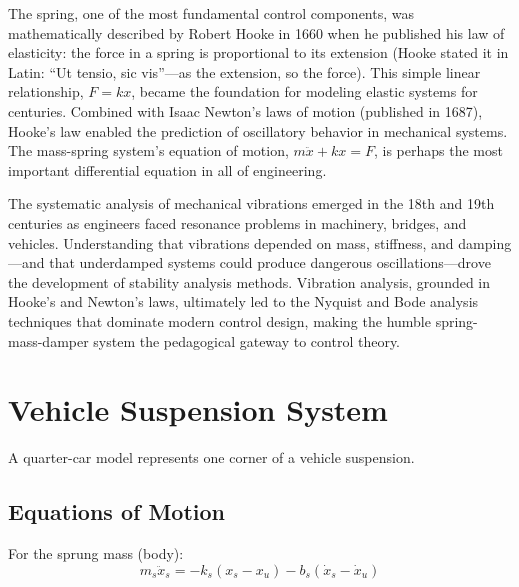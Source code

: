 \begin{historicalbox}[title={Historical Context: Hooke's Law, Newton's Mechanics, and Vibration Analysis}]
The spring, one of the most fundamental control components, was mathematically described by Robert Hooke in 1660 when he published his law of elasticity: the force in a spring is proportional to its extension (Hooke stated it in Latin: ``Ut tensio, sic vis''---as the extension, so the force). This simple linear relationship, $F = kx$, became the foundation for modeling elastic systems for centuries. Combined with Isaac Newton's laws of motion (published in 1687), Hooke's law enabled the prediction of oscillatory behavior in mechanical systems. The mass-spring system's equation of motion, $m\ddot{x} + kx = F$, is perhaps the most important differential equation in all of engineering.

The systematic analysis of mechanical vibrations emerged in the 18th and 19th centuries as engineers faced resonance problems in machinery, bridges, and vehicles. Understanding that vibrations depended on mass, stiffness, and damping---and that underdamped systems could produce dangerous oscillations---drove the development of stability analysis methods. Vibration analysis, grounded in Hooke's and Newton's laws, ultimately led to the Nyquist and Bode analysis techniques that dominate modern control design, making the humble spring-mass-damper system the pedagogical gateway to control theory.
\end{historicalbox}

\section{Vehicle Suspension System}
\label{sec:vehicle_suspension}

A quarter-car model represents one corner of a vehicle suspension.



\subsection{Equations of Motion}

For the sprung mass (body):
\begin{equation}
m_s\ddot{x}_s = -k_s(x_s - x_u) - b_s(\dot{x}_s - \dot{x}_u)
\end{equation}

